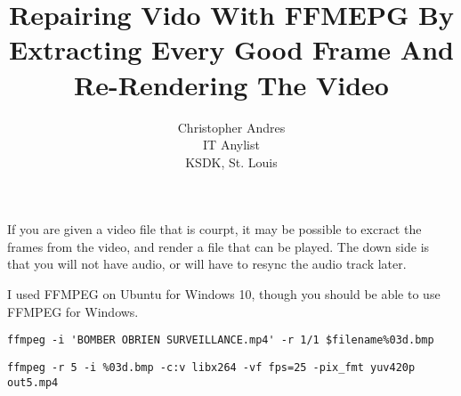\documentclass{article}
\begin{document}
\title{Repairing Vido With FFMEPG By Extracting Every Good Frame And Re-Rendering The Video}
\author{Christopher Andres \\IT Anylist\\KSDK, St. Louis}
\maketitle

If you are given a video file that is courpt, it may be possible to excract the frames from the video, and render a file that can be played. The down side is that you will not have audio, or will have to resync the audio track later.

I used FFMPEG on Ubuntu for Windows 10, though you should be able to use FFMPEG for Windows.

\begin{verbatim}
ffmpeg -i 'BOMBER OBRIEN SURVEILLANCE.mp4' -r 1/1 $filename%03d.bmp
\end{verbatim}

\begin{verbatim}
ffmpeg -r 5 -i %03d.bmp -c:v libx264 -vf fps=25 -pix_fmt yuv420p out5.mp4
\end{verbatim}
\end{document}
